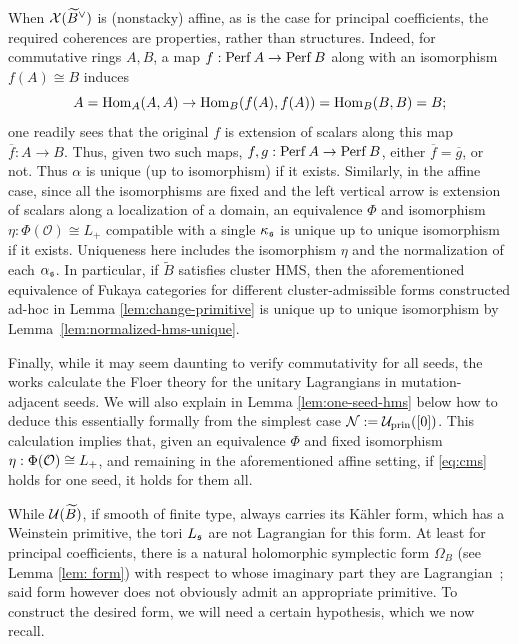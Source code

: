 \documentclass[12pt, letter]{amsart}
\theoremstyle{definition}
\newcommand{\pr}{\mathrm{prin}}
\numberwithin{equation}{section}
\begin{document}
When  $\mathcal{X}(\widetilde B^\vee)$ is (nonstacky)  affine, as is the case for principal coefficients, the required coherences are properties, rather than  structures.  Indeed, for commutative rings $A, B$,  a map $f: \mathrm{Perf}\, A \to \mathrm{Perf}\, B$ along with an isomorphism $f(A) \cong B$ induces 
$$A = \operatorname{Hom}_A(A, A) \to \operatorname{Hom}_B(f(A), f(A)) = \operatorname{Hom}_B(B, B) = B;$$
one readily sees that the original $f$ is extension of scalars along this map $\overline{f}: A \to B$.  Thus, given two such maps, $f, g: \mathrm{Perf}\, A \to \mathrm{Perf}\, B$, either $\overline{f} = \overline{g}$, or not.  Thus $\alpha$ is unique (up to isomorphism) if it exists. Similarly, in the affine case, since all the isomorphisms are fixed and the left vertical arrow is extension of scalars along a localization of a domain, an equivalence $\Phi$ and isomorphism $\eta: \Phi(\mathcal{O}) \cong L_+$ compatible with a single $\kappa_{\mathfrak{s}}$ is unique up to unique isomorphism if it exists.  Uniqueness here includes
the isomorphism $\eta$ and the normalization of each $\alpha_{\mathfrak{s}}$.
In particular, if $\widetilde{B}$ satisfies cluster HMS, then the aforementioned equivalence of Fukaya categories for different cluster-admissible forms constructed ad-hoc in  Lemma \ref{lem:change-primitive} is unique up
to unique isomorphism by Lemma~\ref{lem:normalized-hms-unique}.







Finally, while it may seem daunting to verify commutativity for all seeds, the works \cite{GLe, PT} calculate the Floer theory for the unitary Lagrangians in mutation-adjacent seeds.  We will also explain in Lemma \ref{lem:one-seed-hms} below how to deduce this essentially formally from the simplest case $\cN := \cU_{\pr}([0])$.  This calculation implies that, given an equivalence $\Phi$ and fixed isomorphism $\eta: \Phi(\mathcal{O}) \cong L_+$, and remaining in the aforementioned affine setting, if \eqref{eq:cms} holds for one seed, it holds for them all.  







While $\mathcal{U}(\widetilde{B})$, if smooth of finite type, always carries its K\"ahler form, which has a Weinstein primitive, the tori $L_{\mathfrak{s}}$ are not Lagrangian for this form.  At least for principal coefficients, there is a natural holomorphic symplectic form $\Omega_B$ (see Lemma \ref{lem: form})  with respect to whose imaginary part they are Lagrangian~\cite{GSV05, FG09};  said form however does not obviously admit an appropriate primitive.  To construct the desired form, we will  need a certain hypothesis, which we now recall.
\end{document}
